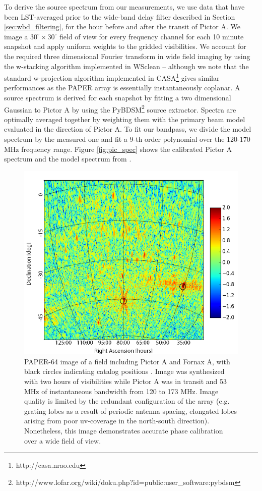 \documentclass[twocolumn,numberedappendix]{emulateapj} \shorttitle{PSA64}
\begin{document}
To derive the source spectrum from our measurements, we use data that have been
LST-averaged prior to the wide-band delay filter described in Section
\ref{sec:wbd_filtering}, for the hour before and after the transit of Pictor A.
We image a $30^\circ \times 30^\circ$ field of view for every frequency channel
for each 10 minute snapshot and apply uniform weights to the gridded
visibilities. We account for the required three dimensional Fourier transform in
wide field imaging by using the w-stacking algorithm implemented in WSclean
\citep{offringa_et_al2014} – although we note that the standard w-projection
algorithm implemented in CASA\footnote{http://casa.nrao.edu} gives similar
performances as the PAPER array is essentially instantaneously coplanar.  A
source spectrum is derived for each snapshot by fitting a two dimensional
Gaussian to Pictor A by using the
PyBDSM\footnote{http://www.lofar.org/wiki/doku.php?id=public:user\_software:pybdsm}
source extractor. Spectra are optimally averaged together by weighting them with
the primary beam model evaluated in the direction of Pictor A. To fit our
bandpass, we divide the model spectrum by the measured one and fit a 9-th order
polynomial over the 120-170 MHz frequency range. Figure \ref{fig:pic_spec} shows
the calibrated Pictor A spectrum and the model spectrum from
\cite{jacobs_et_al2013}.

\begin{figure}
\centering
\includegraphics[width=\columnwidth]{plots/picimg_cs.png}
\caption{
PAPER-64 image of a field including Pictor A and Fornax A, with black circles
indicating catalog positions \citep{jacobs_et_al2011}. Image was synthesized with two hours
of visibilities while Pictor A was in transit and 53 MHz of instantaneous
bandwidth from 120 to 173 MHz.  Image quality is limited by the redundant
configuration of the array (e.g. grating lobes as a result of periodic antenna
spacing, elongated lobes arising from poor uv-coverage in the north-south
direction).  Nonetheless, this image demonstrates accurate phase calibration
over a wide field of view.
} \label{fig:field_image}
\end{figure}
\end{document}
